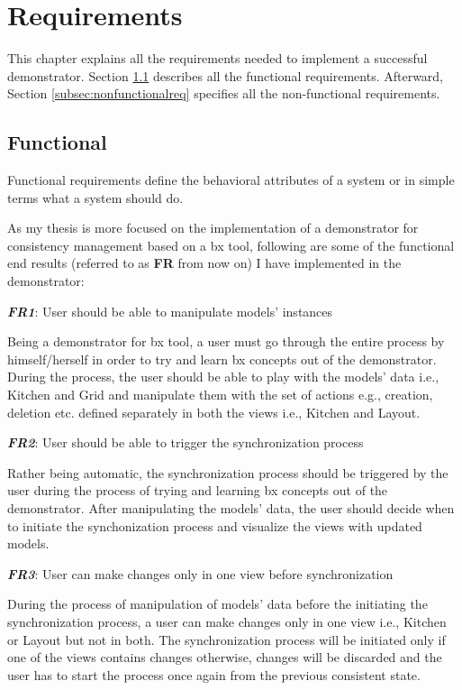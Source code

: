 \section{Requirements}\label{sec:requirements}
This chapter explains all the requirements needed to implement a successful demonstrator. Section \ref{subsec:functionalreq} describes all the functional requirements. Afterward, Section \ref{subsec:nonfunctionalreq} specifies all the non-functional requirements. 

\subsection{Functional}\label{subsec:functionalreq}
Functional requirements define the behavioral attributes of a system \cite{funcandnonfuncreq} or in simple terms what a system should do.

As my thesis is more focused on the implementation of a demonstrator for consistency management based on a bx tool, following are some of the functional end results (referred to as \textbf{FR} from now on) I have implemented in the demonstrator:

\textbf{\textit{FR1}}: User should be able to manipulate models' instances

Being a demonstrator for bx tool, a user must go through the entire process by himself/herself in order to try and learn bx concepts out of the demonstrator. During the process, the user should be able to play with the models' data i.e., Kitchen and Grid and manipulate them with the set of actions e.g., creation, deletion etc. defined separately in both the views i.e., Kitchen and Layout.

\textbf{\textit{FR2}}: User should be able to trigger the synchronization process

Rather being automatic, the synchronization process should be triggered by the user during the process of trying and learning bx concepts out of the demonstrator. After manipulating the models' data, the user should decide when to initiate the synchonization process and visualize the views with updated models.

\textbf{\textit{FR3}}: User can make changes only in one view before synchronization

During the process of manipulation of models' data before the initiating the synchronization process, a user can make changes only in one view i.e., Kitchen or Layout but not in both. The synchronization process will be initiated only if one of the views contains changes otherwise, changes will be discarded and the user has to start the process once again from the previous consistent state.


